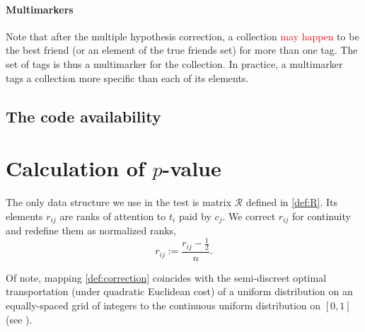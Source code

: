 \documentclass{llncs}
\begin{document}
\paragraph*{Multimarkers} Note that after the multiple hypothesis correction, a collection \textcolor{red}{may happen}
to be the best friend (or an element of the true friends set) for more than one tag. The set of tags is thus a multimarker for the collection. In practice, a multimarker tags a collection more specific than each of its elements.



\subsection{The code availability}













\section{Calculation of $p$-value}
\label{sec:theory}
The only data structure we use in the test is matrix $\mathcal{R}$ defined in \eqref{def:R}.  
Its elements $r_{ij}$ are ranks of attention to $t_i$ paid by $c_j$.
We correct $r_{ij}$ for continuity and redefine them as normalized ranks,
\begin{equation}
\label{def:correction}
r_{ij} := \frac{r_{ij} - \frac{1}{2}}{n}.
\end{equation}

Of note, mapping \eqref{def:correction} coincides with the semi-discreet optimal transportation (under quadratic Euclidean cost) of a uniform distribution on an equally-spaced grid of integers to the continuous uniform distribution on $[0, 1]$ (see \cite{Solomon2018OptimalTO}).
\end{document}
